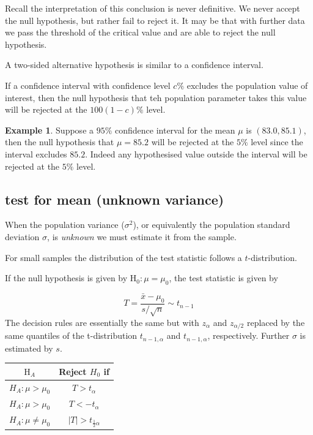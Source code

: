 \documentclass[
]{book}
\theoremstyle{definition}
\theoremstyle{definition}
\newtheorem{example}{Example}[chapter]
\theoremstyle{definition}
\theoremstyle{definition}
\theoremstyle{remark}
\begin{document}
Recall the interpretation of this conclusion is never definitive. We never accept the null hypothesis, but rather fail to reject it. It may be that with further data we pass the threshold of the critical value and are able to reject the null hypothesis.

A two-sided alternative hypothesis is similar to a confidence interval.

If a confidence interval with confidence level \(c\%\) excludes the population value of interest, then the null hypothesis that teh population parameter takes this value will be rejected at the \(100(1-c)\%\) level.

\begin{example}
Suppose a \(95\%\) confidence interval for the mean \(\mu\) is \((83.0,85.1)\), then the null hypothesis that \(\mu=85.2\) will be rejected at the \(5\%\) level since the interval excludes \(85.2\). Indeed any hypothesised value outside the interval will be rejected at the \(5\%\) level.
\end{example}

\hypertarget{test-for-mean-unknown-variance}{%
\subsection{test for mean (unknown variance)}\label{test-for-mean-unknown-variance}}

When the population variance (\(\sigma^2\)), or equivalently the population standard deviation \(\sigma\), is \emph{unknown} we must estimate it from the sample.

For small samples the distribution of the test statistic follows a \(t\)-distribution.

If the null hypothesis is given by \(\text{H}_0: \mu = \mu_0\), the test statistic is given by

\[T = \frac{\bar{x}-\mu_0}{s/\sqrt{n}}\sim t_{n-1}\]
The decision rules are essentially the same but with \(z_\alpha\) and \(z_{\alpha/2}\) replaced by the same quantiles of the t-distribution \(t_{n-1,\alpha}\) and \(t_{n-1,\alpha}\), respectively. Further \(\sigma\) is estimated by \(s\).

\begin{longtable}[]{@{}cc@{}}
\toprule
\(\text{H}_{A}\) & Reject \(H_{0}\) if\tabularnewline
\midrule
\endhead
\(H_{A}: \mu > \mu_0\) & \(T>t_{\alpha}\)\tabularnewline
\(H_{A}: \mu > \mu_0\) & \(T<-t_{\alpha}\)\tabularnewline
\(H_{A}: \mu \neq \mu_0\) & \(|T|>t_{\frac{1}{2}\alpha}\)\tabularnewline
\bottomrule
\end{longtable}
\end{document}
